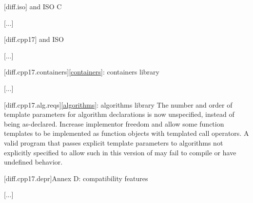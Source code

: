 \setcounter{chapter}{2}

[diff.iso]{\Cpp{} and ISO C}

[...]

\setcounter{section}{4}
[diff.cpp17]{\Cpp{} and ISO \CppXVII{}}

[...]

\setcounter{subsection}{7}
[diff.cpp17.containers]{\ref{containers}: containers library}

[...]

\begin{addedblock}
{\color{newclr}
[diff.cpp17.alg.reqs]{\ref{algorithms}: algorithms library}
\change
The number and order of template parameters for algorithm declarations
is now unspecified, instead of being as-declared.
\rationale Increase implementor freedom and allow some function templates
to be implemented as function objects with templated call operators.
\effect
A valid \CppXVII{} program that passes explicit template parameters to
algorithms not explicitly specified to allow such in this version of \Cpp{}
may fail to compile or have undefined behavior.
} %
\end{addedblock}

[diff.cpp17.depr]{Annex D: compatibility features}

[...]

